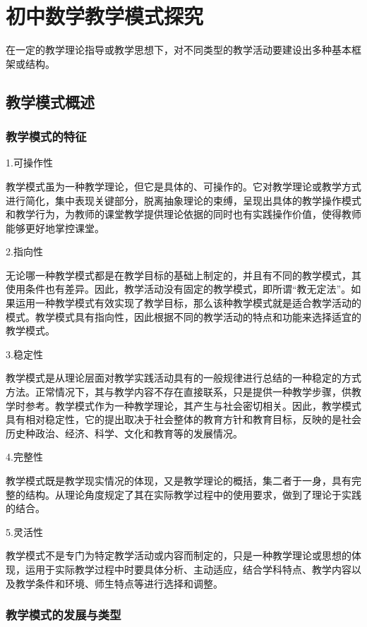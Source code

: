 \documentclass{article}
\begin{document}
\tableofcontents
\newpage
\section{初中数学教学模式探究}

在一定的教学理论指导或教学思想下，对不同类型的教学活动要建设出多种基本框架或结构。

\subsection{教学模式概述}
\subsubsection{教学模式的特征}
1.可操作性

教学模式虽为一种教学理论，但它是具体的、可操作的。它对教学理论或教学方式进行简化，集中表现关键部分，脱离抽象理论的束缚，呈现出具体的教学操作模式和教学行为，为教师的课堂教学提供理论依据的同时也有实践操作价值，使得教师能够更好地掌控课堂。

2.指向性

无论哪一种教学模式都是在教学目标的基础上制定的，并且有不同的教学模式，其使用条件也有差异。因此，教学活动没有固定的教学模式，即所谓“教无定法”。如果运用一种教学模式有效实现了教学目标，那么该种教学模式就是适合教学活动的模式。教学模式具有指向性，因此根据不同的教学活动的特点和功能来选择适宜的教学模式。

3.稳定性

教学模式是从理论层面对教学实践活动具有的一般规律进行总结的一种稳定的方式方法。正常情况下，其与教学内容不存在直接联系，只是提供一种教学步骤，供教学时参考。教学模式作为一种教学理论，其产生与社会密切相关。因此，教学模式具有相对稳定性，它的提出取决于社会整体的教育方针和教育目标，反映的是社会历史种政治、经济、科学、文化和教育等的发展情况。

4.完整性

教学模式既是教学现实情况的体现，又是教学理论的概括，集二者于一身，具有完整的结构。从理论角度规定了其在实际教学过程中的使用要求，做到了理论于实践的结合。

5.灵活性

教学模式不是专门为特定教学活动或内容而制定的，只是一种教学理论或思想的体现，运用于实际教学过程中时要具体分析、主动适应，结合学科特点、教学内容以及教学条件和环境、师生特点等进行选择和调整。

\subsubsection{教学模式的发展与类型}
\end{document}
